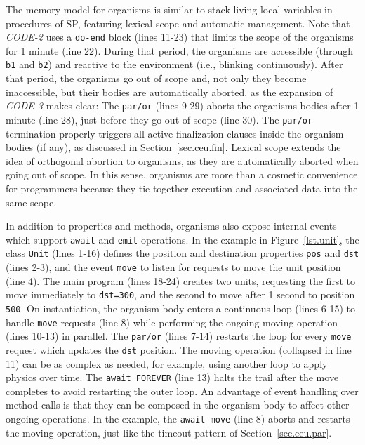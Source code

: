 \documentclass{sigplanconf}
\newcommand{\code}[1] {{\small{\texttt{#1}}}}
\newcommand{\1}{\;}
\newcommand{\2}{\;\;}
\newcommand{\3}{\;\;\;}
\newcommand{\5}{\;\;\;\;\;}
\begin{document}
%

The memory model for organisms is similar to stack-living local variables in 
procedures of SP, featuring lexical scope and automatic management.
Note that \emph{CODE-2} uses a \code{do-end} block (lines 11-23) that limits 
the scope of the organisms for 1 minute (line 22).
%
During that period, the organisms are accessible (through \code{b1} and 
\code{b2}) and reactive to the environment (i.e., blinking continuously).
%
After that period, the organisms go out of scope and, not only they become 
inaccessible, but their bodies are automatically aborted, as the expansion of 
\emph{CODE-3} makes clear:
%
The \code{par/or} (lines 9-29) aborts the organisms bodies after 1 minute (line 
28), just before they go out of scope (line 30).
%
The \code{par/or} termination properly triggers all active finalization clauses 
inside the organism bodies (if any), as discussed in Section~\ref{sec.ceu.fin}.
%
Lexical scope extends the idea of orthogonal abortion to organisms, as they are 
automatically aborted when going out of scope.
%
In this sense, organisms are more than a cosmetic convenience for programmers 
because they tie together execution and associated data into the same scope.

In addition to properties and methods, organisms also expose internal events 
which support \code{await} and \code{emit} operations.
%
In the example in Figure~\ref{lst.unit}, the class \code{Unit} (lines 1-16) 
defines the position and destination properties \code{pos} and \code{dst} 
(lines 2-3), and the event \code{move} to listen for requests to move the unit 
position (line 4).
%
The main program (lines 18-24) creates two units, requesting the first to move 
immediately to \code{dst=300}, and the second to move after 1 second to 
position \code{500}.
%
On instantiation, the organism body enters a continuous loop (lines 6-15) to 
handle \code{move} requests (line 8) while performing the ongoing moving 
operation (lines 10-13) in parallel.
The \code{par/or} (lines 7-14) restarts the loop for every \code{move} request
which updates the \code{dst} position.
%
The moving operation (collapsed in line 11) can be as complex as needed, for 
example, using another loop to apply physics over time.
The \code{await FOREVER} (line 13) halts the trail after the move completes to 
avoid restarting the outer loop.
%
An advantage of event handling over method calls is that they can be composed 
in the organism body to affect other ongoing operations.
In the example, the \code{await move} (line 8) aborts and restarts the moving 
operation, just like the timeout pattern of Section~\ref{sec.ceu.par}.
\end{document}

